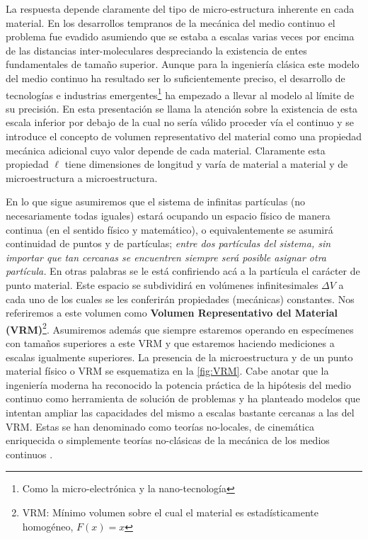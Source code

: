 \documentclass[../notas medios.tex]{subfiles}
\begin{document}
La respuesta depende claramente del tipo de micro-estructura inherente en cada 
material.  En los desarrollos tempranos de la mecánica del medio continuo el 
problema fue evadido asumiendo que se estaba a escalas varias veces por encima 
de las distancias inter-moleculares despreciando la existencia de entes 
fundamentales de tamaño superior.  Aunque para la ingeniería clásica este 
modelo del medio continuo ha resultado ser lo suficientemente preciso, el 
desarrollo de tecnologías e industrias emergentes\footnote{Como la 
micro-electrónica y la nano-tecnología} ha empezado a llevar al modelo al 
límite de su precisión.  En esta presentación se llama la atención sobre la 
existencia de esta escala inferior por debajo de la cual no sería válido 
proceder vía el continuo y se introduce el concepto de volumen representativo 
del material como una propiedad mecánica adicional cuyo valor depende de cada 
material.  Claramente esta propiedad $\ell$ tiene dimensiones de longitud y 
varía de material a material y de microestructura a microestructura.

En lo que sigue asumiremos que el sistema de infinitas partículas (no
necesariamente todas iguales) estará ocupando un espacio físico de manera 
continua (en el sentido físico y matemático), o equivalentemente se asumirá 
continuidad de puntos y de partículas; \emph{entre dos partículas del 
sistema, sin importar que tan cercanas se encuentren siempre será posible 
asignar otra partícula.} En otras palabras se le está confiriendo acá a la 
partícula el carácter de punto material.  Este espacio se subdividirá en 
volúmenes infinitesimales $\Delta V$ a cada uno de los cuales se les conferirán 
propiedades (mecánicas) constantes.  Nos referiremos a este volumen como 
\textbf{Volumen Representativo del Material  (VRM)}\footnote{VRM: Mínimo 
volumen sobre el cual el material es estadísticamente homogéneo, $F(x)=x$}.  
Asumiremos además que siempre estaremos operando en especímenes con tamaños 
superiores a este VRM y que estaremos haciendo mediciones a escalas igualmente 
superiores.  La presencia de la microestructura y de un punto material físico o 
VRM se esquematiza en la \cref{fig:VRM}.  Cabe anotar que la ingeniería moderna 
ha 
reconocido la potencia práctica de la hipótesis del medio continuo como 
herramienta de solución de problemas y ha planteado modelos que intentan 
ampliar las capacidades del mismo a escalas bastante cercanas a las del VRM.  
Estas se han denominado como teorías no-locales, de cinemática enriquecida o 
simplemente teorías no-clásicas de la mecánica de los medios continuos 
\cite{voigt1887, toupin1962, mindlin1964, eringen1966, cosserat1909, aero1961}.
\end{document}
